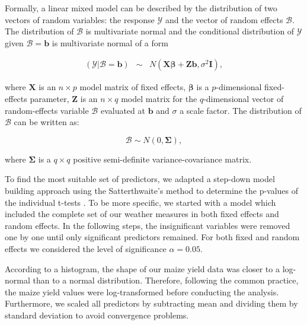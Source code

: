\documentclass[12pt]{iopart}
\begin{document}
Formally, a linear mixed model can be described by the distribution of two vectors of random variables: the response $\mathscr{Y}$ and the vector of random effects $\mathscr{B}$. The distribution of $\mathscr{B}$ is multivariate normal and the conditional distribution of $\mathscr{Y}$ given $\mathscr{B}=\mathbf{b}$ is multivariate normal of a form %




\begin{equation}\label{MixedGeneral}
\begin{array}{lcl}

(\mathscr{Y}|\mathscr{B}=\mathbf{b})& \sim & \mathit{N}(\mathbf{X}\mathbf{\beta}+\mathbf{Z}\mathbf{b},\sigma^2\mathbf{I}),

\end{array}
\end{equation}

where $\mathbf{X}$ is an $n \times p$ model matrix of fixed effects, $\mathbf{\beta}$ is a $p$-dimensional fixed-effects parameter, $\mathbf{Z}$ is an $n \times q$ model matrix for the $q$-dimensional vector of random-effects variable $\mathscr{B}$ evaluated at $\mathbf{b}$ and $\sigma$ a scale factor. The distribution of $\mathscr{B}$ can be written as: 

\begin{equation}\label{ranefDist}
\mathscr{B} \sim \mathit{N}(0,\mathbf{\Sigma}),
\end{equation}

where $\mathbf{\Sigma}$ is a $q \times q$ positive semi-definite variance-covariance matrix.

To find the most suitable set of predictors, we adapted a step-down model building approach using the Satterthwaite's method to determine the p-values of the individual t-tests \cite{lmerTest}. To be more specific, we started with a model which included the complete set of our weather measures in both fixed effects and random effects. In the following steps, the insignificant variables were removed one by one until only significant predictors remained. For both fixed and random effects we considered the level of significance $\alpha=0.05$. 

According to a histogram, the shape of our maize yield data was closer to a log-normal than to a normal distribution. Therefore, following the common practice, the  maize yield values were log-transformed before conducting the analysis. Furthermore, we scaled all predictors by subtracting mean and dividing them by standard deviation to avoid convergence problems.
\end{document}
